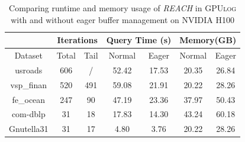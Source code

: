 \documentclass[nonacm,sigplan]{acmart}
\newcommand{\tool}{\textsc{GPUlog}}
\begin{document}
\begin{table}[t]
    \fontsize{9}{11}\selectfont
    \caption{\fontsize{9}{11}\selectfont Comparing runtime and memory usage of \textit{REACH} in \tool{} with and without eager buffer management on NVIDIA H100}
    \begin{tabular}{@{}c||cc||cc||cc@{}}
   \toprule
    & \multicolumn{2}{c|}{Iterations}  & \multicolumn{2}{c|}{Query Time (s)}  & \multicolumn{2}{c}{Memory(GB)}   \\
    \midrule
             Dataset   &  Total & Tail  & Normal        & Eager       & Normal         & Eager                  \\
    \midrule 
    usroads     & 606  & /  & 52.42         & 17.53       & 20.35          & 26.84         \\
    vsp\_finan  & 520  & 491  & 59.08         & 21.91       &  20.22          & 28.26       \\
    fe\_ocean   & 247  & 90   & 47.19         & 23.36       &  37.97          & 50.43        \\
    com-dblp    & 31   & 18   & 17.83         & 14.30       &  43.24          & 60.18       \\
    Gnutella31  & 31   & 17   & 4.80          & 3.76        & 20.22          & 28.26        \\
    \bottomrule 
    \end{tabular}
   \label{tab:buffer_compare}
\end{table}



\end{document}
